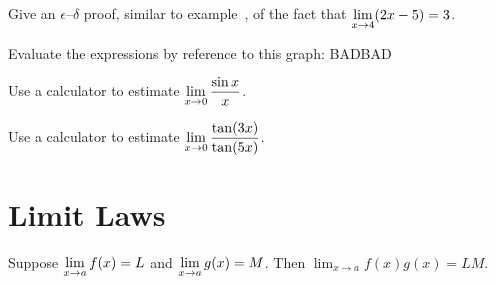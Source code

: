 \begin{exercises}
\begin{exercise} Give an $\epsilon$--$\delta$ proof, similar to
example~,
of the fact that 
$\displaystyle \lim_{x\to 4} (2x-5) = 3$. 
\end{exercise}

\begin{exercise} Evaluate the expressions by reference to this graph:\hfill\break
BADBAD


\end{exercise}

\begin{exercise} Use a calculator to estimate $\displaystyle\lim_{x\to 0}
{\sin x\over x}$.
\end{exercise}

\begin{exercise} Use a calculator to estimate $\displaystyle\lim_{x\to 0}
{\tan(3x)\over\tan(5x)}$.
\end{exercise}
\end{exercises}






\section{Limit Laws}

\begin{theorem} 
Suppose $\displaystyle \lim_{x\to a} f(x)=L$ and $\displaystyle \lim_{x\to a}g(x)=M$. Then
$\lim_{x\to a} f(x)g(x) = LM$.
\end{theorem}


